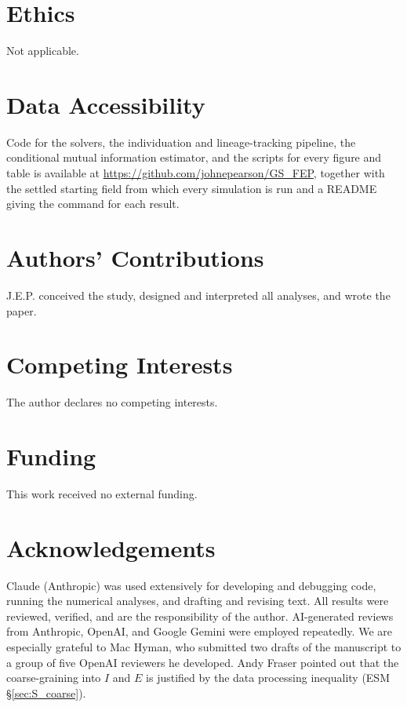 \documentclass[11pt]{article}
\begin{document}
\section*{Ethics}

Not applicable.

\section*{Data Accessibility}

Code for the solvers, the individuation and lineage-tracking pipeline, the conditional mutual information estimator, and the scripts for every figure and table is available at \url{https://github.com/johnepearson/GS_FEP}, together with the settled starting field from which every simulation is run and a README giving the command for each result.

\section*{Authors' Contributions}

J.E.P. conceived the study, designed and interpreted all analyses, and wrote the paper.

\section*{Competing Interests}

The author declares no competing interests.

\section*{Funding}

This work received no external funding.

\section*{Acknowledgements}

Claude (Anthropic) was used extensively for developing and debugging code, running the numerical analyses, and drafting and revising text. All results were reviewed, verified, and are the responsibility of the author. AI-generated reviews from Anthropic, OpenAI, and Google Gemini were employed repeatedly. We are especially grateful to Mac Hyman, who submitted two drafts of the manuscript to a group of five OpenAI reviewers he developed. Andy Fraser pointed out that the coarse-graining into $I$ and $E$ is justified by the data processing inequality (ESM \S\ref{sec:S_coarse}).



\end{document}
